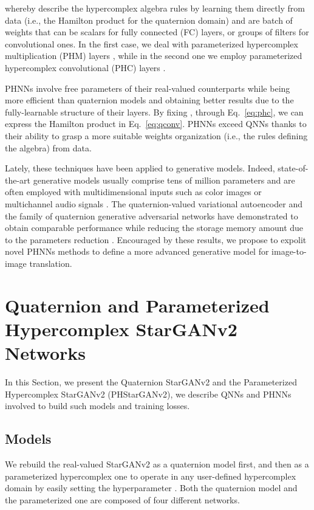 \documentclass[conference]{IEEEtran}
\begin{document}
\noindent whereby  describe the hypercomplex algebra rules by learning them directly from data (i.e., the Hamilton product for the quaternion domain) and  are batch of weights that can be scalars for fully connected (FC) layers, or groups of filters for convolutional ones. In the first case, we deal with parameterized hypercomplex multiplication (PHM) layers \cite{Zhang2021PHM, mahabadi2021compacter}, while in the second one we employ parameterized hypercomplex convolutional (PHC) layers \cite{grassucci2021lightweight}.

PHNNs involve  free parameters of their real-valued counterparts while being more efficient than quaternion models and obtaining better results due to the fully-learnable structure of their layers. By fixing , through Eq.~\ref{eq:phc}, we can express the Hamilton product in Eq.~\ref{eq:qconv}. PHNNs exceed QNNs thanks to their ability to grasp a more suitable weights organization (i.e., the rules defining the algebra) from data.

Lately, these techniques have been applied to generative models. Indeed, state-of-the-art generative models usually comprise tens of million parameters and are often employed with multidimensional inputs such as color images or multichannel audio signals \cite{Brock2019LargeSG, Patashnik2021StyleCLIP}. The quaternion-valued variational autoencoder and the family of quaternion generative adversarial networks have demonstrated to obtain comparable performance while reducing the storage memory amount due to the parameters reduction \cite{GrassucciICASSP2021, Grassucci2021Entropy, GrassucciQGAN2021, Qgan2021Sfikas}. Encouraged by these results, we propose to expolit novel PHNNs methods to define a more advanced generative model for image-to-image translation. 


\section{Quaternion and Parameterized Hypercomplex StarGANv2 Networks}
\label{sec:method}

In this Section, we present the Quaternion StarGANv2 and the Parameterized Hypercomplex StarGANv2 (PHStarGANv2), we describe QNNs and PHNNs involved to build such models and training losses.

\subsection{Models}

We rebuild the real-valued StarGANv2 \cite{Choi2020StarGAN2} as a quaternion model first, and then as a parameterized hypercomplex one to operate in any user-defined hypercomplex domain by easily setting the hyperparameter . Both the quaternion model and the parameterized one are composed of four different networks.
\end{document}
